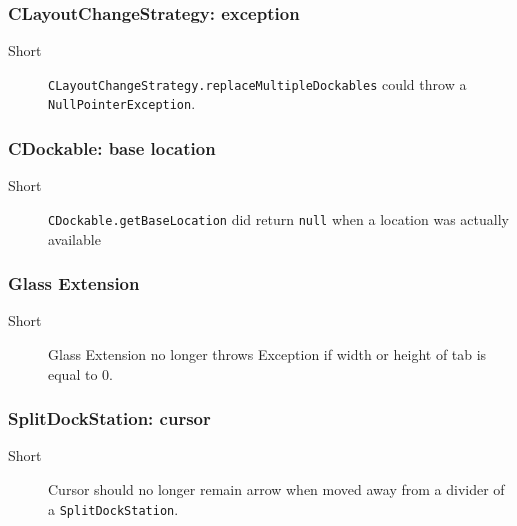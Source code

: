 \documentclass[a4paper,10pt]{article}
\newcommand{\src}[1]{\lstinline[basicstyle=\normalsize\ttfamily,keywordstyle=\normalsize\ttfamily,identifierstyle=\normalsize\ttfamily]|#1|}
\newcommand{\short}{\item[Short]}
\begin{document}
\subsubsection{CLayoutChangeStrategy: exception}
\begin{description}
 \short \src{CLayoutChangeStrategy.replaceMultipleDockables} could throw a \linebreak \src{NullPointerException}.
\end{description}

\subsubsection{CDockable: base location}
\begin{description}
 \short \src{CDockable.getBaseLocation} did return \src{null} when a location was actually available
\end{description}

\subsubsection{Glass Extension}
\begin{description}
 \short Glass Extension no longer throws Exception if width or height of tab is equal to 0.
\end{description}

\subsubsection{SplitDockStation: cursor}
\begin{description}
 \short Cursor should no longer remain arrow when moved away from a divider of a \src{SplitDockStation}.
\end{description}
\end{document}

